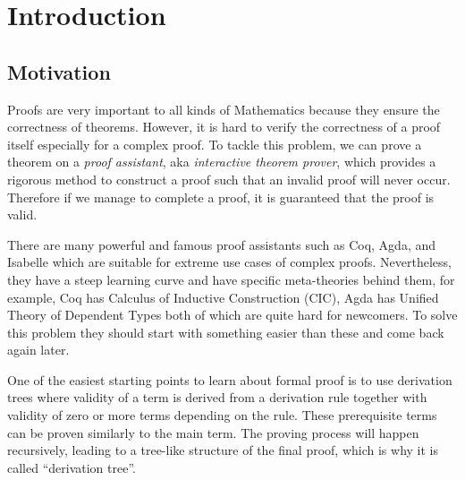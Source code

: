 \documentclass[master.tex]{subfiles}
\begin{document}
\chapter{Introduction}

\section{Motivation}

Proofs are very important to all kinds of Mathematics because they ensure the
correctness of theorems. However, it is hard to verify the correctness of a
proof itself especially for a complex proof. To tackle this problem, we can
prove a theorem on a \emph{proof assistant}, aka \emph{interactive theorem
  prover}, which provides a rigorous method to construct a proof such that an
invalid proof will never occur. Therefore if we manage to complete a proof, it
is guaranteed that the proof is valid.

There are many powerful and famous proof assistants such as
Coq\supercite{coq-official-website}, Agda\supercite{agda-official-website}, and
Isabelle\supercite{isabelle-official-website} which are suitable for extreme use
cases of complex proofs. Nevertheless, they have a steep learning curve and have
specific meta-theories behind them, for example, Coq has Calculus of Inductive
Construction (CIC), Agda has Unified Theory of Dependent
Types\supercite{norell:thesis}\supercite{Luo:1994:CRT:184757} both of which are
quite hard for newcomers. To solve this problem they should start with something
easier than these and come back again later.

One of the easiest starting points to learn about formal proof is to use
derivation trees where validity of a term is derived from a derivation rule
together with validity of zero or more terms depending on the rule. These
prerequisite terms can be proven similarly to the main term. The proving process
will happen recursively, leading to a tree-like structure of the final proof,
which is why it is called ``derivation tree''.
\end{document}
